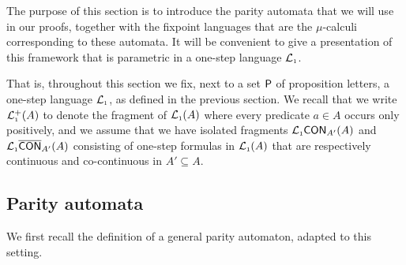 

The purpose of this section is to introduce the parity automata that we will use
in our proofs, together with the fixpoint languages that are the $\mu$-calculi 
corresponding to these automata.
It will be convenient to give a presentation of this framework that is parametric
in a one-step language $\mathcal{L}_{\scriptscriptstyle 1}$.

That is, throughout this section we fix, next to a set $\mathsf{P}$ of proposition 
letters, a one-step language $\mathcal{L}_{\scriptscriptstyle 1}$, as defined in the previous section.
We recall that we write $\mathcal{L}_{\scriptscriptstyle 1}^+(A)$ to denote the fragment of $\mathcal{L}_{\scriptscriptstyle 1}(A)$ 
where every predicate $a\in A$ occurs only positively, and we assume that 
we have isolated fragments $\mathcal{L}_{\scriptscriptstyle 1}\mathsf{CON}_{A'}(A)$ and $\mathcal{L}_{\scriptscriptstyle 1}\overline{\mathsf{CON}}_{A'}(A)$
consisting of one-step formulas in $\mathcal{L}_{\scriptscriptstyle 1}(A)$ that are respectively continuous
and co-continuous in $A' \subseteq A$.

\subsection{Parity automata}

We first recall the definition of a general parity automaton, adapted to this
setting. 

